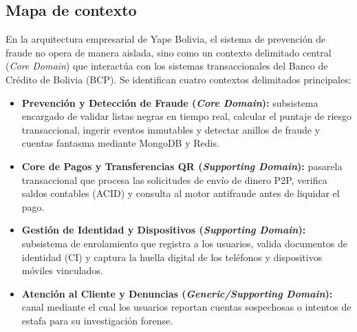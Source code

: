 \documentclass[11pt,a4paper]{article}
\begin{document}
	\subsection{Mapa de contexto}
	En la arquitectura empresarial de Yape Bolivia, el sistema de prevención de fraude no opera de manera aislada, sino como un contexto delimitado central (\textit{Core Domain}) que interactúa con los sistemas transaccionales del Banco de Crédito de Bolivia (BCP). Se identifican cuatro contextos delimitados principales:
	\begin{itemize}[leftmargin=2em]
		\item \textbf{Prevención y Detección de Fraude (\textit{Core Domain}):} subsistema encargado de validar listas negras en tiempo real, calcular el puntaje de riesgo transaccional, ingerir eventos inmutables y detectar anillos de fraude y cuentas fantasma mediante MongoDB y Redis.
		\item \textbf{Core de Pagos y Transferencias QR (\textit{Supporting Domain}):} pasarela transaccional que procesa las solicitudes de envío de dinero P2P, verifica saldos contables (ACID) y consulta al motor antifraude antes de liquidar el pago.
		\item \textbf{Gestión de Identidad y Dispositivos (\textit{Supporting Domain}):} subsistema de enrolamiento que registra a los usuarios, valida documentos de identidad (CI) y captura la huella digital de los teléfonos y dispositivos móviles vinculados.
		\item \textbf{Atención al Cliente y Denuncias (\textit{Generic/Supporting Domain}):} canal mediante el cual los usuarios reportan cuentas sospechosas o intentos de estafa para su investigación forense.
	\end{itemize}
	
\end{document}

